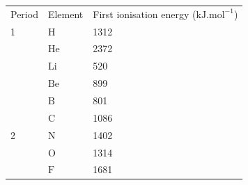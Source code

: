 \begin{enumerate}[noitemsep, label=\textbf{\arabic*}. ]
          \begin{table}[H]
        \begin{center}
      \label{m38757*id263866}
    \noindent
      \tablelasttail{}
      \begin{xtabular}[t]{|l|l|l|}\hline
        Period &
        Element &
        First ionisation energy ($\mathrm{kJ}.{\mathrm{mol}}^{-1}$)%
     \tabularnewline{}
        1 &
        $\mathrm{H}$ &
        1312%
     \tabularnewline{}
         &
        $\mathrm{He}$ &
        2372%
     \tabularnewline{}
         &
        $\mathrm{Li}$ &
        520%
     \tabularnewline{}
         &
        $\mathrm{Be}$ &
        899%
     \tabularnewline{}
         &
        $\mathrm{B}$ &
        801%
     \tabularnewline{}
         &
        $\mathrm{C}$ &
        1086%
     \tabularnewline{}
        2 &
        $\mathrm{N}$ &
        1402%
     \tabularnewline{}
         &
        $\mathrm{O}$ &
        1314%
     \tabularnewline{}
         &
        $\mathrm{F}$ &
        1681%
     \tabularnewline{}

\end{xtabular}
\end{center}
\end{table}
\end{enumerate}
